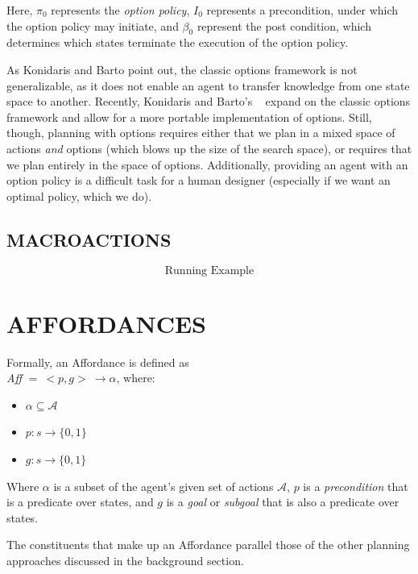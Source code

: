 \documentclass[]{article}
\begin{document}
Here, $\pi_0$ represents the {\it option policy}, $I_0$ represents a precondition, under which the option policy may initiate, and $\beta_0$ represent the post condition, which determines which states terminate the execution of the option policy.

As Konidaris and Barto point out, the classic options framework is not generalizable, as it does not enable an agent to transfer knowledge from one state space to another. Recently, Konidaris and Barto's ~\citep{konidaris} expand on the classic options framework and allow for a more portable implementation of options. Still, though, planning with options requires either that we plan in a mixed space of actions {\it and} options (which blows up the size of the search space), or requires that we plan entirely in the space of options. Additionally, providing an agent with an option policy is a difficult task for a human designer (especially if we want an optimal policy, which we do).

\subsection{MACROACTIONS}

\[
\boxed{\text{Running Example}}
\]

\section{AFFORDANCES}

Formally, an Affordance is defined as \vspace{1 mm} \\
{\it Aff} $ =\ <p,g>\ \longrightarrow \alpha$, where:

\begin{itemize}
\item[] $\alpha \subseteq \mathcal{A}$
\item[] $p : s \longrightarrow \{$0$, 1\}$
\item[] $g : s \longrightarrow \{$0$,1\}$
\end{itemize}

Where $\alpha$ is a subset of the agent's given set of actions $\mathcal{A}$, $p$ is a {\it precondition} that is a predicate over states, and $g$ is a {\it goal} or {\it subgoal} that is also a predicate over states.

The constituents that make up an Affordance parallel those of the other planning approaches discussed in the background section.
\end{document}
